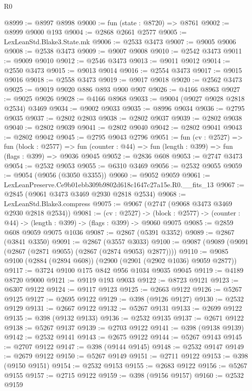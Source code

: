 \begin{lexlean}{R0}
\begin{coremodule}
@8999 := @8997 @8998
@9000 := fun (state : @8720) => @8761
@9002 := @8999 @9000 @193
@9004 := @2868 @2661 @2577
@9005 := LexLeanStd.Blake3.State.mk
@9006 := @2533 @3473
@9007 := @9005 @9006
@9008 := @2538 @3473
@9009 := @9007 @9008
@9010 := @2542 @3473
@9011 := @9009 @9010
@9012 := @2546 @3473
@9013 := @9011 @9012
@9014 := @2550 @3473
@9015 := @9013 @9014
@9016 := @2554 @3473
@9017 := @9015 @9016
@9018 := @2558 @3473
@9019 := @9017 @9018
@9020 := @2562 @3473
@9025 := @9019 @9020 @886 @893 @900 @907
@9026 := @4166 @8963
@9027 := @9025 @9026
@9028 := @4166 @8968
@9033 := @9004 (@9027 @9028 @2818 @2534) @3469
@9034 := @9002 @9033
@9035 := @8996 @9034
@9036 := @2795 @9035
@9037 := @2802 @2803
@9038 := @2802 @9037
@9039 := @2802 @9038
@9040 := @2802 @9039
@9041 := @2802 @9040
@9042 := @2802 @9041
@9043 := @2802 @9042
@9045 := @2795 @9043 @2796
@9051 := fun (cv : @2527) =>
  fun (block : @2577) =>
  fun (counter : @44) => fun (length : @399) => fun (flags : @399) => @9036 @9045
@9052 := @2836 @608
@9053 := @2747 @3473
@9054 := @2532 @9053
@9055 := @6310 @3469
@9056 := @2532 @9055
@9059 := @9054 (@9056 (@3050 @3355))
@9060 := @9052 @9059
@9061 := LexLeanPreserve.Ce9b01ebb309b9802d618c1647c27a15e.R0.__fits_13
@9067 := @2845 (@9061 @3473 @3469 @2930 @2818 @2534)
@9068 := LexLeanStd.Blake3.compress
@9075 := @9067 (@2747 (@9068 @3473 @3469 @2930 @2818 @2534))
@9081 := (cv : @2527) ->
  (block : @2577) -> (counter : @44) -> (length : @399) -> (flags : @399) -> @9060 @9075
@9085 := @2859 @608 @9059 @9075 @1036
@9087 := @2867 (@5391 @3352)
@9089 := @2867 (@3841 @3350)
@9091 := @2867 (@3557 @3033)
@9100 := @9087 (@9089 (@9091 (@2867 (@2871 @9055) (@2867 (@2874 @9053) @2877))))
@9110 := @9085 @9100 (@2884 (@2894 @608)) (@2900 (@2901 (@2902 @1036) @9059 @2877))
@9117 := @3724 @9100 @175 @842 @956 @1034 @9035 @9045
@9119 := @4189 @8720 @9000
@9121 := @9119 @193 @9033
@9122 := @8723 @9121
@9123 := @6307 @9122
@9124 := @9117 @9123
@9125 := @2663 @9122
@9126 := @5267 @9125
@9127 := @2695 @9122
@9129 := @398 (@9126 @9127)
@9130 := @2532 @9129
@9131 := @2667 @9122
@9132 := @5267 @9131
@9133 := @2699 @9122
@9135 := @398 (@9132 @9133)
@9136 := @2532 @9135
@9137 := @2671 @9122
@9138 := @5267 @9137
@9139 := @2703 @9122
@9141 := @398 (@9138 @9139)
@9142 := @2532 @9141
@9143 := @2675 @9122
@9144 := @5267 @9143
@9145 := @2707 @9122
@9147 := @398 (@9144 @9145)
@9148 := @2532 @9147
@9149 := @2679 @9122
@9150 := @5267 @9149
@9151 := @2711 @9122
@9153 := @398 (@9150 @9151)
@9154 := @2532 @9153
@9155 := @2683 @9122
@9156 := @5267 @9155
@9157 := @2715 @9122
@9159 := @398 (@9156 @9157)
@9160 := @2532 @9159

\end{coremodule}
\end{lexlean}
